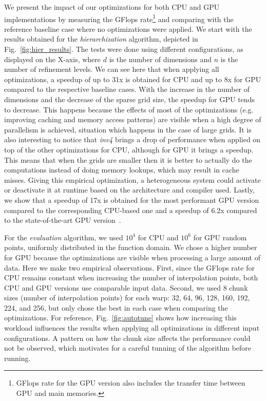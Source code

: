 We present the impact of our optimizations for both CPU and GPU implementations
by measuring the GFlops rate\footnote{GFlops rate for the GPU version
also includes the transfer time between GPU and main memories.} and comparing
with the reference baseline case where no optimizations were applied. We start
with the results obtained for the \textit{hierarchization} algorithm, depicted
in Fig.~\ref{fig:hier_results}. The tests were done using different
configurations, as displayed on the X-axis, where $d$ is the number of
dimensions and $n$ is the number of refinement levels. We can see here that when
applying all optimizations, a speedup of up to 31x is obtained for CPU and up to
8x for GPU compared to the respective baseline cases. With the increase in the
number of dimensions and the decrease of the sparse grid size, the speedup for
GPU tends to decrease. This happens because the effects of most of the
optimizations (e.g. improving caching and memory access patterns) are visible
when a high degree of parallelism is achieved, situation which happens in the
case of large grids. It is also interesting to notice that \textit{inv4} brings
a drop of performance when applied on top of the other optimizations for CPU,
although for GPU it brings a speedup. This means that when the grids are smaller
then it is better to actually do the computations instead of doing memory
lookups, which may result in cache misses. Giving this empirical optimization, a
heterogeneous system could activate or deactivate it at runtime based on the
architecture and compiler used. Lastly, we show that a speedup of 17x is
obtained for the most performant GPU version compared to the corresponding
CPU-based one and a speedup of 6.2x compared to the state-of-the-art GPU
version~\cite{Murarasu:2011:CDS:1941553.1941559}.

For the \textit{evaluation} algorithm, we used $10^{4}$ for CPU and $10^{6}$
for GPU random points, uniformly distributed in the function domain. We
chose a higher number for GPU because the optimizations are visible when
processing a large amount of data. Here we make two empirical observations.
First, since the GFlops rate for CPU remains constant when increasing the number
of interpolation points, both CPU and GPU versions use comparable input data.
Second, we used 8 chunk sizes (number of interpolation points) for each warp:
32, 64, 96, 128, 160, 192, 224, and 256, but only chose the best in each case
when comparing the optimizations. For reference, Fig.~\ref{fig:autotune} shows
how increasing this workload influences the results when applying all
optimizations in different input configurations. A pattern on how the chunk size
affects the performance could not be observed, which motivates for a careful
tunning of the algorithm before running.

